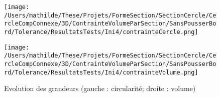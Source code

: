 \documentclass[11pt,a4paper]{article}
\begin{document}
\begin{figure}[H]
	\label{fig:cerclevol3Dini3objFin}
	\begin{minipage}{0.45\textwidth}
		\centering
		\texttt{[image: /Users/mathilde/These/Projets/FormeSection/SectionCercle/CercleCompConnexe/3D/ContrainteVolumeParSection/SansPousserBord/Tolerance/ResultatsTests/Ini4/contrainteCercle.png]}
	\end{minipage}	
	\begin{minipage}{0.45\textwidth}
		\centering
		\texttt{[image: /Users/mathilde/These/Projets/FormeSection/SectionCercle/CercleCompConnexe/3D/ContrainteVolumeParSection/SansPousserBord/Tolerance/ResultatsTests/Ini4/contrainteVolume.png]}
	\end{minipage}	
	\caption{Evolution des grandeurs (gauche : circularité; droite : volume)}	
\end{figure}
\end{document}
